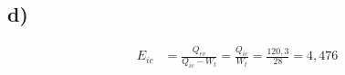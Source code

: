 

\subsection*{d)}
\begin{align*}
    E_{ic} &= \frac{Q_{ev}}{Q_{ic} - W_t} = \frac{Q_{ic}}{W_t} = \frac{120,3}{28} = 4,476
\end{align*}